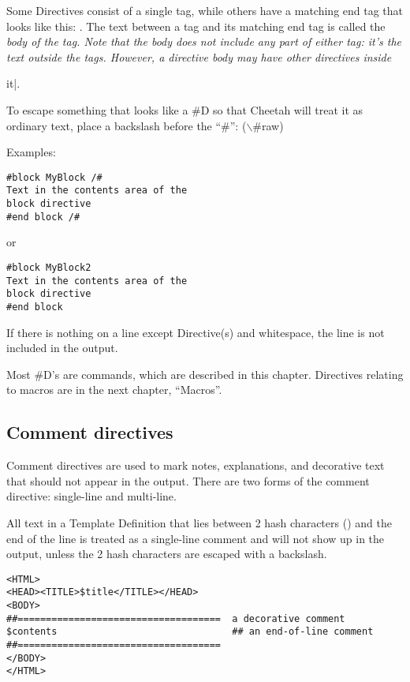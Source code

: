 Some Directives consist of a single tag, while others have a matching end tag
that looks like this: .  The text between a tag and
its matching end tag is called the \em{body} of the tag.  Note that the body
does not include any part of either tag: it's the text \em{outside} the tags.
However, a directive body may have other directives inside \em{it|.

To escape something that looks like a #D so that Cheetah will treat it as
ordinary text, place a backslash before the ``#'':
($\backslash$#raw) 

Examples:

\begin{verbatim}
#block MyBlock /#
Text in the contents area of the
block directive
#end block /#
\end{verbatim}
or
\begin{verbatim}
#block MyBlock2
Text in the contents area of the
block directive
#end block
\end{verbatim}


If there is nothing on a line except Directive(s) and whitespace, the line is
not included in the output.


Most #D's are commands, which are described in this chapter.  Directives
relating to macros are in the next chapter, ``Macros''.


\subsection{Comment directives}

Comment directives are used to mark notes, explanations, and decorative text
that should not appear in the output.  There are two forms of the comment
directive: single-line and multi-line.

All text in a Template Definition that lies between 2 hash characters
(\code{\#\#}) and the end of the line is treated as a single-line comment and
will not show up in the output, unless the 2 hash characters are escaped with a
backslash.
\begin{verbatim}
<HTML>
<HEAD><TITLE>$title</TITLE></HEAD>
<BODY>
##====================================  a decorative comment
$contents                               ## an end-of-line comment
##====================================
</BODY>
</HTML>
\end{verbatim}

}
